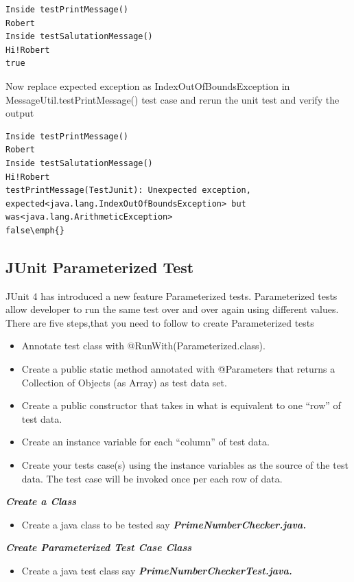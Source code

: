 \documentclass[11pt,a4paper]{article}
\begin{document}
\begin{lstlisting}[numbers=none]
Inside testPrintMessage()
Robert
Inside testSalutationMessage()
Hi!Robert
true
\end{lstlisting}

Now replace expected exception as IndexOutOfBoundsException in MessageUtil.testPrintMessage() test case and rerun the unit test and verify the output

\begin{lstlisting}[numbers=none]
Inside testPrintMessage()
Robert
Inside testSalutationMessage()
Hi!Robert
testPrintMessage(TestJunit): Unexpected exception, expected<java.lang.IndexOutOfBoundsException> but was<java.lang.ArithmeticException>
false\emph{}
\end{lstlisting}


\subsection*{JUnit Parameterized Test}
JUnit 4 has introduced a new feature Parameterized tests. Parameterized tests allow developer to run the same test over and over again using different values. There are five steps,that you need to follow to create Parameterized tests


\begin{itemize}
\item Annotate test class with @RunWith(Parameterized.class).
\item Create a public static method annotated with @Parameters that returns a Collection of Objects (as Array) as test data set.
\item Create a public constructor that takes in what is equivalent to one ``row'' of test data.
\item Create an instance variable for each ``column'' of test data.
\item Create your tests case(s) using the instance variables as the source of the test data.
The test case will be invoked once per each row of data.
\end{itemize}


\emph{\textbf{Create a Class}}
\begin{itemize}
\item Create a java class to be tested say \emph{\textbf{PrimeNumberChecker.java.}}
\end{itemize}

\emph{\textbf{Create Parameterized Test Case Class}}
\begin{itemize}
\item Create a java test class say \emph{\textbf{PrimeNumberCheckerTest.java.}}
\end{itemize}
\end{document}
